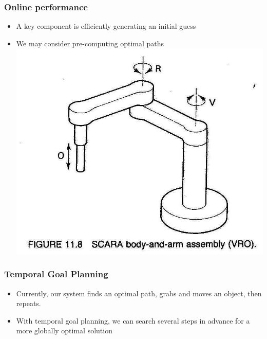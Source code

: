 \documentclass{beamer}
\begin{document}
\begin{frame}
\frametitle{Online performance}
\begin{itemize}
\item A key component is efficiently generating an initial guess
\item We may consider pre-computing optimal paths
\includegraphics[width=0.55\linewidth,height=0.55\textheight,keepaspectratio]{scara2.jpg}


\end{itemize}

\end{frame}

\begin{frame}
\frametitle{Temporal Goal Planning}
\begin{itemize}
\item Currently, our system finds an optimal path, grabs and moves an object, then repeats.
\item With temporal goal planning, we can search several steps in advance for a more 
globally optimal solution
\end{itemize}

\end{frame}
\end{document}
